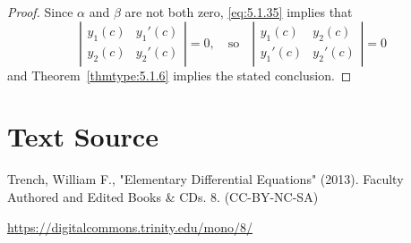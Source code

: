 \documentclass{ximera}
\begin{document}
\begin{proof} Since $\alpha$ and $\beta$ are not both zero,   \eqref{eq:5.1.35}
implies that
$$
\left|\begin{array}{ccccccc}
y_{1}(c)&y_{1}'(c)\\y_{2}(c)& y_{2}'(c)
\end{array}\right|=0, \quad\text{so}\quad
\left|\begin{array}{cccccc}
y_{1}(c)&y_{2}(c)\\ y_{1}'(c)&y_{2}'(c)
\end{array}\right|=0
$$
and Theorem~\ref{thmtype:5.1.6} implies the stated conclusion.
\end{proof}

\section*{Text Source}
Trench, William F., "Elementary Differential Equations" (2013). Faculty Authored and Edited Books \& CDs. 8. (CC-BY-NC-SA)

\href{https://digitalcommons.trinity.edu/mono/8/}{https://digitalcommons.trinity.edu/mono/8/}
\end{document}
